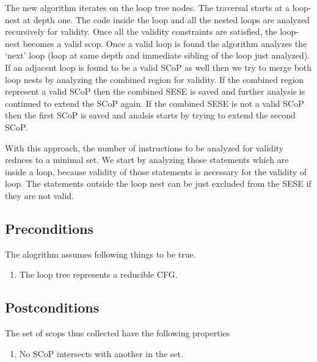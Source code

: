 \documentclass{sigplanconf}
\begin{document}

The new algorithm iterates on the loop tree nodes. The traversal starts at a loop-nest at depth one.
The code inside the loop and all the nested loops are analyzed recursively for validity. Once all the validity
constraints are satisfied, the loop-nest becomes a valid scop. Once a valid loop is found the algorithm analyzes the
`next' loop (loop at same depth and immediate sibling of the loop just analyzed). If an adjacent loop is found to be a
valid SCoP as well then we try to merge both loop nests by analyzing the combined region for validity. If the combined
region represent a valid SCoP then the combined SESE is saved and further analysis is continued to extend the SCoP
again. If the combined SESE is not a valid SCoP then the first SCoP is saved and analsis starts by trying to extend
the second SCoP.

With this approach, the number of instructions to be analyzed for validity reduces to a minimal set.
We start by analyzing those statements which are inside a loop, because validity of those statements is
necessary for the validity of loop. The statements outside the loop nest can be just excluded from the
SESE if they are not valid.

\subsection{Preconditions}
The alogrithm assumes following things to be true.
\begin{enumerate}
\item The loop tree represents a reducible CFG.
\end{enumerate}

\subsection{Postconditions}
The set of scops thus collected have the following properties
\begin{enumerate}
\item No SCoP intersects with another in the set.
\end{enumerate}
\end{document}

